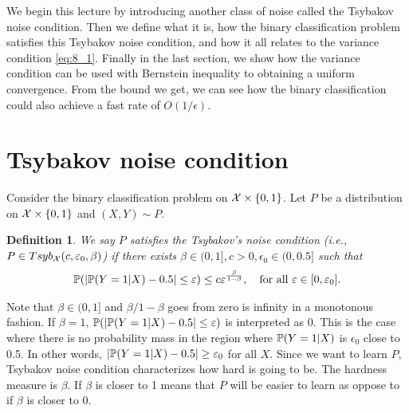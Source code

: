\documentclass[twoside]{article}
\newtheorem{definition}[theorem]{Definition}
\begin{document}
We begin this lecture by introducing another class of noise called the Tsybakov noise condition.  Then we define what it is, how the binary classification problem satisfies this Tsybakov noise condition, and how it all relates to the variance condition \cref{eq:8_1}.  Finally in the last section, we show how the variance condition can be used with Bernstein inequality to obtaining a uniform convergence.  From the bound we get, we can see how the binary classification could also achieve a fast rate of $O(1/\epsilon)$.   


\section{Tsybakov noise condition}
Consider the binary classification problem on $\mathcal{X} \times \{0,1\}$.  Let $P$ be a distribution on $\mathcal{X} \times \{0, 1\}$ and $(X,Y) \sim P$. 

\begin{definition}
    We say $P$ satisfies the Tsybakov's noise condition (i.e., $P \in Tsyb_{\mathcal{X}}(c, \varepsilon_0,\beta)$) if there exists $\beta \in (0,1], c > 0, \epsilon_0 \in (0, 0.5]$ such that 
    \begin{align}
        \mathbb{P}(| \mathbb{P}(Y=1 | X) - 0.5 | \leq \varepsilon ) \leq c \varepsilon^{\frac{\beta}{1-\beta}}, \quad \text{for all } \varepsilon \in [0, \varepsilon_0].
    \end{align}
\end{definition}
Note that $\beta \in (0, 1]$ and $\beta/1-\beta$ goes from zero is infinity in a monotonous fashion.  If $\beta = 1$, $\mathbb{P}(| \mathbb{P}(Y=1 | X) - 0.5 | \leq \varepsilon )$ is interpreted as $0$.  This is the case where there is no probability mass in the region where $\mathbb{P}(Y=1 |X)$ is $\epsilon_0$ close to 0.5.  In other words, $|\mathbb{P}(Y=1 | X) - 0.5 | \geq \varepsilon_0$ for all $X$.  Since we want to learn $P$, Tsybakov noise condition characterizes how hard is going to be.  The hardness measure is $\beta$.  If $\beta$ is closer to 1 means that $P$ will be easier to learn as oppose to if $\beta$ is closer to 0.
\end{document}
